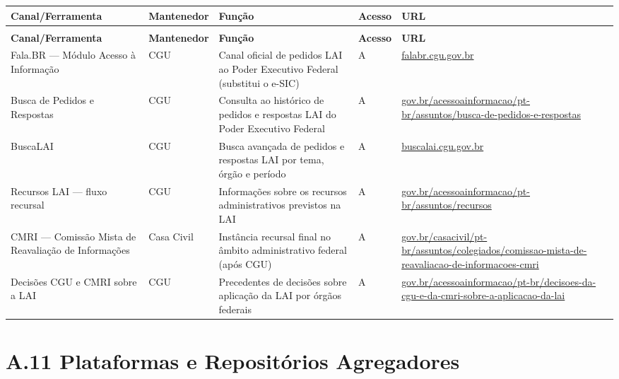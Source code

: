 {\setlength{\tabcolsep}{3pt}\footnotesize\begin{longtable}{@{} >{\raggedright\arraybackslash}p{3.2cm} >{\raggedright\arraybackslash}p{2cm} >{\raggedright\arraybackslash}p{4cm} >{\raggedright\arraybackslash}p{1cm} >{\raggedright\arraybackslash}p{3cm} @{}}
\toprule
\textbf{Canal\slash Ferramenta} & \textbf{Mantenedor} & \textbf{Função} & \textbf{Acesso} & \textbf{URL} \\
\midrule
\endfirsthead
\multicolumn{5}{l}{\small\textit{(continuação)}} \\
\toprule
\textbf{Canal\slash Ferramenta} & \textbf{Mantenedor} & \textbf{Função} & \textbf{Acesso} & \textbf{URL} \\
\midrule
\endhead
\bottomrule
\endfoot

Fala.BR --- Módulo Acesso à Informação
  & CGU
  & Canal oficial de pedidos LAI ao Poder Executivo Federal (substitui o e-SIC)
  & A
  & \url{falabr.cgu.gov.br} \\

Busca de Pedidos e Respostas
  & CGU
  & Consulta ao histórico de pedidos e respostas LAI do Poder Executivo Federal
  & A
  & \url{gov.br/acessoainformacao/pt-br/assuntos/busca-de-pedidos-e-respostas} \\

BuscaLAI
  & CGU
  & Busca avançada de pedidos e respostas LAI por tema, órgão e período
  & A
  & \url{buscalai.cgu.gov.br} \\

Recursos LAI --- fluxo recursal
  & CGU
  & Informações sobre os recursos administrativos previstos na LAI
  & A
  & \url{gov.br/acessoainformacao/pt-br/assuntos/recursos} \\

CMRI --- Comissão Mista de Reavaliação de Informações
  & Casa Civil
  & Instância recursal final no âmbito administrativo federal (após CGU)
  & A
  & \url{gov.br/casacivil/pt-br/assuntos/colegiados/comissao-mista-de-reavaliacao-de-informacoes-cmri} \\

Decisões CGU e CMRI sobre a LAI
  & CGU
  & Precedentes de decisões sobre aplicação da LAI por órgãos federais
  & A
  & \url{gov.br/acessoainformacao/pt-br/decisoes-da-cgu-e-da-cmri-sobre-a-aplicacao-da-lai} \\

\end{longtable}}

\section*{A.11 Plataformas e Repositórios Agregadores}

